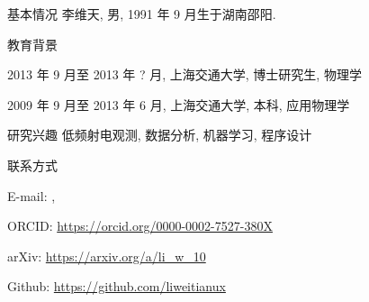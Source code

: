 
\begin{resume}
  \begin{resumesection}{基本情况}
    李维天, 男, 1991 年 9 月生于湖南邵阳.
  \end{resumesection}

  \begin{resumelist}{教育背景}
    \item 2013 年 9 月至 2013 年 ? 月, 上海交通大学, 博士研究生, 物理学
    \item 2009 年 9 月至 2013 年 6 月, 上海交通大学, 本科, 应用物理学
  \end{resumelist}

  \begin{resumesection}{研究兴趣}
    低频射电观测, 数据分析, 机器学习, 程序设计
  \end{resumesection}

  \begin{resumelist}{联系方式}
    \item E-mail:
      , \hspace{0.5em}
    \item ORCID: \url{https://orcid.org/0000-0002-7527-380X}
    \item arXiv: \url{https://arxiv.org/a/li_w_10}
    \item Github: \url{https://github.com/liweitianux}
  \end{resumelist}
\end{resume}
